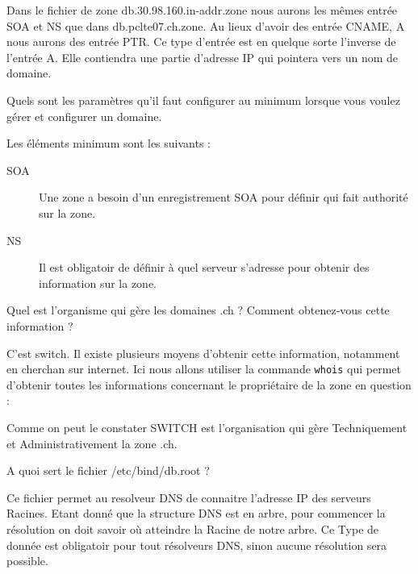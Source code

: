 \documentclass[a4paper, 12pt]{article}
\begin{document}
Dans le fichier de zone db.30.98.160.in-addr.zone nous aurons les mêmes entrée SOA et NS que dans db.pclte07.ch.zone. Au lieux d'avoir  des entrée CNAME, A nous aurons des entrée PTR. Ce type d'entrée est en quelque sorte l'inverse de l'entrée A. Elle contiendra une partie d'adresse IP qui pointera vers un nom de domaine. 

\begin{question}[resume]
\item Quels sont les paramètres qu'il faut configurer au minimum lorsque vous voulez gérer et configurer un domaine.
\end{question}
Les éléments minimum sont les suivants :
\begin{description}
 \item[SOA] Une zone a besoin d'un enregistrement SOA pour définir qui fait authorité sur la zone.
 \item[NS] Il est obligatoir de définir à quel serveur s'adresse pour obtenir des information sur la zone.
\end{description}

\begin{question}[resume]
\item Quel est l'organisme qui gère les domaines .ch ? Comment obtenez-vous cette information ?
\end{question}
C'est switch. Il existe plusieurs moyens d'obtenir cette information, notamment en cherchan sur internet. Ici nous allons utiliser la commande \texttt{whois} qui permet d'obtenir toutes les informations concernant le propriétaire de la zone en question :


Comme on peut le constater SWITCH est l'organisation qui gère Techniquement et Administrativement la zone .ch.

\begin{question}[resume]
\item A quoi sert le fichier /etc/bind/db.root ?
\end{question}

Ce fichier permet au resolveur DNS de connaitre l'adresse IP des serveurs Racines. Etant donné que la structure DNS est en arbre, pour commencer la résolution on doit savoir où atteindre la Racine de notre arbre. Ce Type de donnée est obligatoir pour tout résolveurs DNS, sinon aucune résolution sera possible.
\end{document}
